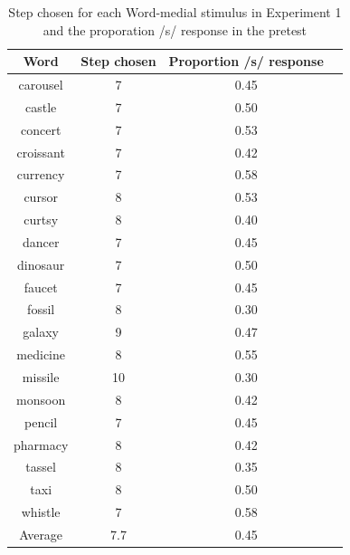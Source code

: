 \begin{table}
\caption{Step chosen for each Word-medial stimulus in Experiment 1 and the proporation /s/ response in the pretest}
\label{tbl:exp1srespfinal}
\centering
\begin{tabular}{cccc}
\toprule
 Word & Step chosen & Proportion /s/ response \\
\midrule
carousel & 7 & 0.45 \\
castle & 7 & 0.50 \\
concert & 7 & 0.53 \\
croissant & 7 & 0.42 \\
currency & 7 & 0.58 \\
cursor & 8 & 0.53 \\
 curtsy & 8 & 0.40 \\
 dancer & 7 & 0.45 \\
 dinosaur & 7 & 0.50 \\
 faucet & 7 & 0.45 \\
 fossil & 8 & 0.30 \\
 galaxy & 9 & 0.47 \\
 medicine & 8 & 0.55 \\
 missile & 10 & 0.30 \\
 monsoon & 8 & 0.42 \\
 pencil & 7 & 0.45 \\
pharmacy & 8 & 0.42 \\
tassel & 8 & 0.35 \\
 taxi & 8 & 0.50 \\
 whistle & 7 & 0.58 \\
\midrule
 Average   & 7.7 & 0.45 \\

\bottomrule
\end{tabular}
\end{table}

